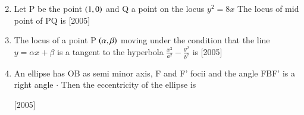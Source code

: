 \documentclass[journal,12pt,twocolumn]{IEEEtran}
\theoremstyle{remark}
\begin{document}
\begin{enumerate}
\begin{enumerate}[label=(\alph*)]
\begin{multicols}{2}
\end{multicols}
\end{enumerate}

\hfill 

\item Let P be the point {$ \left(1,0\right) $} and Q a point on the locus {$ y^2 = 8x $} The locus of mid point of PQ is \hfill{[2005]}

\begin{enumerate}[label=(\alph*)]
\end{enumerate}

\hfill

\item The locus of a point P {$ \left(\alpha,\beta\right) $} moving under the condition that the line {$ y = \alpha x + \beta $} is a tangent to the hyperbola {$ \frac{x^2}{a^2} - \frac{y^2}{b^2} $} is \hfill{[2005]}

\begin{enumerate}[label=(\alph*)]
\end{enumerate}

\hfill

\item An ellipse has OB as semi minor axis, F and F' focii and the angle FBF' is a right angle {$ \cdot $} Then the eccentricity of the ellipse is

\hfill
\hfill{[2005]}

\begin{enumerate}[label=(\alph*)]
\end{enumerate}
\end{enumerate}
\end{document}
